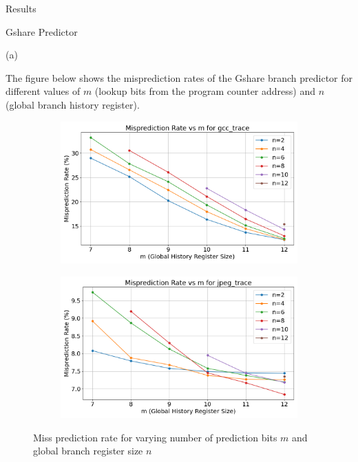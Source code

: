 \begin{section}{Results}
    \begin{subsection}{Gshare Predictor}
        
        \begin{center}
            (a)
        \end{center}

        The figure below shows the misprediction rates of the Gshare branch predictor for different values of $m$ (lookup bits from the program counter address) and $n$ (global branch history register).


        \begin{figure}[h] %
            \centering
            \begin{subfigure}[b]{0.45\textwidth}
                \centering
                \includegraphics[width=\textwidth]{figures/fig2/gcc_misprediction_plot.png} %
                \label{fig:pic1}
            \end{subfigure}
            \hfill
            \begin{subfigure}[b]{0.45\textwidth}
                \centering
                \includegraphics[width=\textwidth]{figures/fig2/jpeg_misprediction_plot.png} %
                \label{fig:pic2}
            \end{subfigure}
            \caption{Miss prediction rate for varying number of prediction bits $m$ and global branch register size $n$}
            \label{fig:twopictures}
        \end{figure}


\end{subsection}
\end{section}
